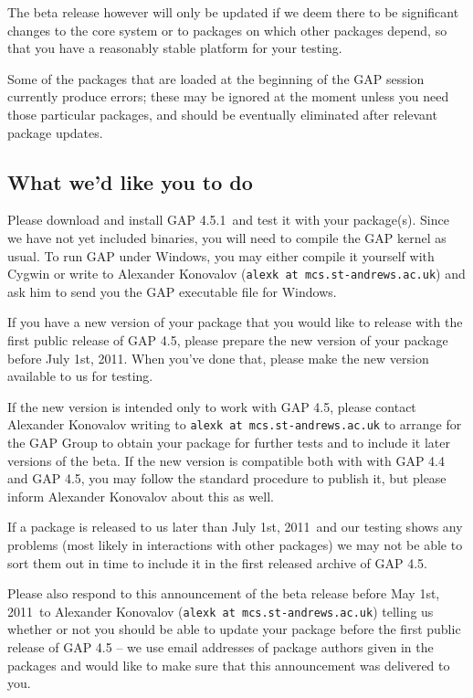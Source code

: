 \documentclass[10pt]{article}
\def\replydate{May 1st, 2011}
\def\pkgdeadline{July 1st, 2011}
\def\betaversion{4.5.1}
\begin{document}
The beta release however will only be updated 
if we deem there to be significant changes to the core system or to packages on which 
other packages depend, so that you have a reasonably stable platform for your testing. 

Some of the packages that are loaded at the beginning of the GAP session 
currently produce errors; these may be ignored at the moment unless you 
need those particular packages, and should be eventually eliminated after 
relevant package updates.



\subsection*{What we'd like you to do}



Please download and install GAP \betaversion \, and test it with your package(s). 
Since we have not yet included binaries, you will need to compile the GAP kernel as usual. To run GAP under
Windows, you may either compile it yourself with Cygwin or write to Alexander 
Konovalov (\verb|alexk at mcs.st-andrews.ac.uk|) and ask him to send you the  GAP 
executable file for Windows.


If you have a new version of your package that you would like to  release with the first
public release of GAP 4.5, please prepare the new version of your package 
before \pkgdeadline. When you've done that, please make the new version available to us for testing.

If the new version is intended only to work with GAP 4.5, please 
contact Alexander Konovalov writing to \verb|alexk at mcs.st-andrews.ac.uk|
to arrange for the GAP Group to obtain your package for further tests and to include it later versions of the beta. If the
new version is compatible both with with GAP 4.4 and GAP 4.5, you
may follow the standard procedure to publish it, but please
inform Alexander Konovalov about this as well.

If a package is released to us later than \pkgdeadline \, and our testing shows any problems 
(most likely in interactions with other packages) we may not be able to 
sort them out in time to include it in the first released archive of GAP 4.5. 

Please also respond to this announcement of the beta release before \replydate \,
to Alexander Konovalov (\verb|alexk at mcs.st-andrews.ac.uk|) 
telling us whether or not you should be able to update your package before the 
first public release of GAP 4.5 -- we use email addresses of package authors 
given in the packages and would like to make sure that this announcement
was delivered to you.
\end{document}
